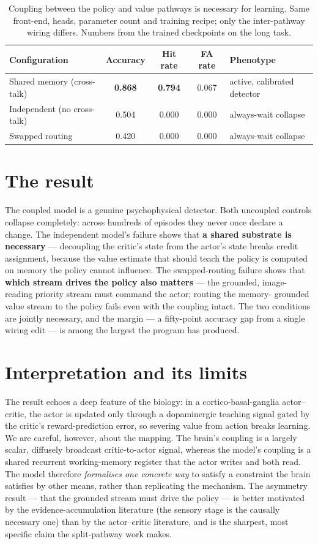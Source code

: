 \begin{table}[t]
\centering
\caption{Coupling between the policy and value pathways is necessary for learning. Same
front-end, heads, parameter count and training recipe; only the inter-pathway wiring
differs. Numbers from the trained checkpoints on the long task.}
\label{tab:crosstalk}
\small
\begin{tabular}{lcccl}
\toprule
Configuration & Accuracy & Hit rate & FA rate & Phenotype \\
\midrule
Shared memory (cross-talk) & \textbf{0.868} & \textbf{0.794} & 0.067 & active, calibrated detector \\
Independent (no cross-talk) & 0.504 & 0.000 & 0.000 & always-wait collapse \\
Swapped routing & 0.420 & 0.000 & 0.000 & always-wait collapse \\
\bottomrule
\end{tabular}
\end{table}

\section{The result}
The coupled model is a genuine psychophysical detector. Both uncoupled controls collapse
completely: across hundreds of episodes they never once declare a change. The independent
model's failure shows that \textbf{a shared substrate is necessary} --- decoupling the
critic's state from the actor's state breaks credit assignment, because the value estimate
that should teach the policy is computed on memory the policy cannot influence. The
swapped-routing failure shows that \textbf{which stream drives the policy also matters} ---
the grounded, image-reading priority stream must command the actor; routing the memory-
grounded value stream to the policy fails even with the coupling intact. The two conditions
are jointly necessary, and the margin --- a fifty-point accuracy gap from a single wiring
edit --- is among the largest the program has produced.

\section{Interpretation and its limits}
The result echoes a deep feature of the biology: in a cortico-basal-ganglia actor--critic,
the actor is updated only through a dopaminergic teaching signal gated by the critic's
reward-prediction error, so severing value from action breaks learning. We are careful,
however, about the mapping. The brain's coupling is a largely scalar, diffusely broadcast
critic-to-actor signal, whereas the model's coupling is a shared recurrent working-memory
register that the actor writes and both read. The model therefore \emph{formalises one
concrete way} to satisfy a constraint the brain satisfies by other means, rather than
replicating the mechanism. The asymmetry result --- that the grounded stream must drive the
policy --- is better motivated by the evidence-accumulation literature (the sensory stage is
the causally necessary one) than by the actor--critic literature, and is the sharpest,
most specific claim the split-pathway work makes.

